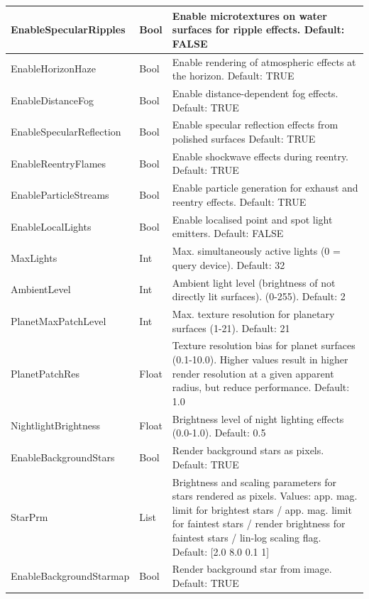 \documentclass[Orbiter User Manual.tex]{subfiles}
\begin{document}
\begin{longtable}{ |p{}|p{}|p{}| }
	\hline\rule{0pt}{2ex}
	EnableSpecularRipples & Bool & Enable microtextures on water surfaces for ripple effects. Default: FALSE\\
	\hline\rule{0pt}{2ex}
	EnableHorizonHaze & Bool & Enable rendering of atmospheric effects at the horizon. Default: TRUE\\
	\hline\rule{0pt}{2ex}
	EnableDistanceFog & Bool & Enable distance-dependent fog effects. Default: TRUE\\
	\hline\rule{0pt}{2ex}
	EnableSpecular­Reflection & Bool & Enable specular reflection effects from polished surfaces Default: TRUE\\
	\hline\rule{0pt}{2ex}
	EnableReentryFlames & Bool & Enable shockwave effects during reentry. Default: TRUE\\
	\hline\rule{0pt}{2ex}
	EnableParticleStreams & Bool & Enable particle generation for exhaust and reentry effects. Default: TRUE\\
	\hline\rule{0pt}{2ex}
	EnableLocalLights & Bool & Enable localised point and spot light emitters. Default: FALSE\\
	\hline\rule{0pt}{2ex}
	MaxLights & Int & Max. simultaneously active lights (0 = query device). Default: 32\\
	\hline\rule{0pt}{2ex}
	AmbientLevel & Int & Ambient light level (brightness of not directly lit surfaces). (0-255). Default: 2\\
	\hline\rule{0pt}{2ex}
	PlanetMaxPatchLevel & Int & Max. texture resolution for planetary surfaces (1-21). Default: 21\\
	\hline\rule{0pt}{2ex}
	PlanetPatchRes & Float & Texture resolution bias for planet surfaces (0.1-10.0). Higher values result in higher render resolution at a given apparent radius, but reduce performance. Default: 1.0\\
	\hline\rule{0pt}{2ex}
	NightlightBrightness & Float & Brightness level of night lighting effects (0.0-1.0). Default: 0.5\\
	\hline\rule{0pt}{2ex}
	EnableBackgroundStars & Bool & Render background stars as pixels. Default: TRUE\\
	\hline\rule{0pt}{2ex}
	StarPrm & List & Brightness and scaling parameters for stars rendered as pixels. Values: app. mag. limit for brightest stars / app. mag. limit for faintest stars / render brightness for faintest stars / lin-log scaling flag. Default: [2.0 8.0 0.1 1]\\
	\hline\rule{0pt}{2ex}
	EnableBackgroundStarmap & Bool & Render background star from image. Default: TRUE\\

\end{longtable}
\end{document}
